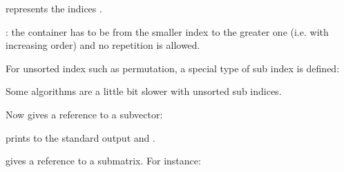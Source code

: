 \documentclass[a4paper,11pt,english]{sphinxmanual}
\begin{document}
\sphinxAtStartPar
represents the indices .

\sphinxAtStartPar
{} : the container  has to be  from the smaller index to the greater one (i.e. with increasing order) and no repetition is allowed.

\sphinxAtStartPar
For unsorted index such as permutation, a special type of sub index is defined:

\begin{sphinxVerbatim}[commandchars=\\\{\}]
 
\end{sphinxVerbatim}

\sphinxAtStartPar
Some algorithms are a little bit slower with unsorted sub indices.

\sphinxAtStartPar
Now  gives a reference to a sub\sphinxhyphen{}vector:

\begin{sphinxVerbatim}[commandchars=\\\{\}]
 
\PYG{p}{[}\PYG{p}{]}  
      
\end{sphinxVerbatim}

\sphinxAtStartPar
prints to the standard output  and .

\sphinxAtStartPar
{} gives a reference to a sub\sphinxhyphen{}matrix. For instance:
\end{document}
